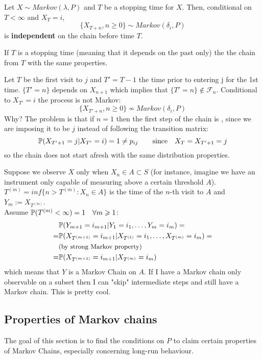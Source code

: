 \documentclass{article}
\begin{document}
	\begin{theorem}{}
		Let $X\sim Markov(\lambda,P)$ and $T$ be a stopping time for $X$. Then, conditional on $T<\infty$ and $X_T=i$, 
		\[
		\{X_{T+n},n\geqslant 0\}\sim Markov(\delta_i,P)
		\]
		is \textbf{independent} on the chain before time $T$.
	\end{theorem}
	If $T$ is a stopping time (meaning that it depends on the past only) the the chain  from $T$ with the same properties.
	\begin{example}
		Let $T$ be the first visit to $j$ and $T'=T-1$ the time prior to entering j for the 1st time. $\{T'=n\}$ depends on $X_{n+1}$ which implies that $\{T'=n\}\notin\mathscr{F}_n$. Conditional to $X_{T'}=i$ the process is not Markov:
		\[
		\{X_{T'+n},n\geqslant 0\}\not\sim Markov(\delta_i,P)
		\]
		Why? The problem is that if $n=1$ then the first step of the chain is , since we are imposing it to be $j$ instead of following the transition matrix:
		\[
		\mathbb{P}(X_{T'+1}=j|X_{T'}=i)=1\neq p_{ij} \qquad\text{since}\quad X_T=X_{T'+1}=j
		\]
		so the chain does not start afresh with the same distribution properties.
	\end{example}
	\begin{example}
		Suppose we observe $X$ only when $X_n\in A\subset S$ (for instance, imagine we have an instrument only capable of measuring above a certain threshold $A$). $T^{(m)}=inf\{n> T^{(m)}:X_n \in A\}$ is the time of the $n$-th visit to $A$ and $Y_m:=X_{T^{(m)}}$.\\
		Assume $\mathbb{P}(T^{(m)}<\infty)=1 \quad \forall m \geqslant 1$:
		\begin{align*}
			&\mathbb{P}(Y_{m+1}=i_{m+1}|Y_1=i_1,\ldots,Y_m=i_m)=\\
			=&\mathbb{P}(X_{T^{(m+1)}}=i_{m+1}|X_{T^{(1)}}=i_1,\ldots,X_{T^{(m)}}=i_m)=\\
			&\text{\small(by strong Markov property)}\\
			=&\mathbb{P}(X_{T^{(m+1)}}=i_{m+1}|X_{T^{(m)}}=i_m)
		\end{align*}
		which means that $Y$ is a Markov Chain on $A$. If I have a Markov chain only observable on a subset then I can "skip" intermediate steps and still have a Markov chain. This is pretty cool.
	\end{example}
	\subsection{Properties of Markov chains}
	The goal of this section is to find the conditions on $P$ to claim certain properties of Markov Chains, especially concerning long-run behaviour.
	
\end{document}
